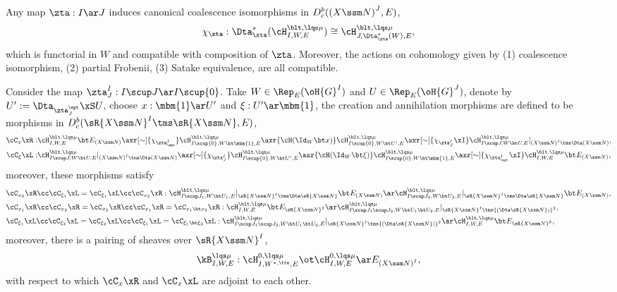 \documentclass[article, a4paper, twoside]{universal}
\begin{document}
\begin{thm}
	Any map $\zta:I\ar J$ induces canonical coalescence isomorphisms in $D_{c}^{b}({(X\ssm N)}^{J},E)$,
	\[
		\chi_{\zta}:\Dta_{\zta}^{*}(\cH_{I,W,E}^{\blt,\lqs\mu})\cong\cH_{J,\Dta_{\zta}^{*}(W),E}^{\blt,\lqs\mu},
	\]
	which is functorial in $W$ and compatible with composition of $\zta$. Moreover, the actions on cohomology given by (1) coalescence isomorphism, (2) partial Frobenii, (3) Satake equivalence, are all compatible.
\end{thm}

\begin{thm}
	Consider the map $\zta_{J}^{I}:I\scup J\ar I\scup\{0\}$. Take $W\in\Rep_{E}(\oH{G}^{I})$ and $U\in\Rep_{E}(\oH{G}^{J})$, denote by $U':=\Dta_{\zta_{J}^{\ept}}\xS U$, choose $x:\mbm{1}\ar U'$ and $\xi:U'\ar\mbm{1}$, the creation and annihilation morphisms are defined to be morphisms in $D_{c}^{b}(\sR{X\ssm N}^{I}\tms\sR{X\ssm N}, E)$,
	\begin{align*}
	  \cC_{x}\xR:& \cH_{I,W,E}^{\blt,\lqs\mu}\bt E_{(X\ssm N)}\axr[\sim]{\chi_{\zta_{\ept}^{I}}} \cH_{I\scup\{0\},W\bt\mbm{1},E}^{\blt,\lqs\mu}\axr{\cH(\Id_{W}\bt x)}\cH_{I\scup\{0\},W\bt U',E}^{\blt,\lqs\mu}\axr[\sim]{\chi_{\zta_{J}^{I}}\xI}\cH_{I\scup J,W\bt U,E}^{\blt,\lqs\mu}|_{{(X\ssm N)}^{I}\tms\Dta(X\ssm N)},\\
	  \cC_{\xi}\xL:& \cH_{I\scup J,W\bt U,E}^{\blt,\lqs\mu}|_{{(X\ssm N)}^{I}\tms\Dta(X\ssm N)}\axr[\sim]{\chi_{\zta_{J}^{I}}}\cH_{I\scup\{0\},W\bt U',E}^{\blt,\lqs\mu}\axr{\cH(\Id_{W}\bt \xi)}\cH_{I\scup\{0\},W\bt\mbm{1},E}^{\blt,\lqs\mu}\axr[\sim]{\chi_{\zta_{\ept}^{I}}\xI} \cH_{I,W,E}^{\blt,\lqs\mu}\bt E_{(X\ssm N)},
	\end{align*}
	moreover, these morphisms satisfy
	\begin{align*}
	  &\cC_{x_{2}}\xR\cc\cC_{\xi_{1}}\xL=\cC_{\xi_{1}}\xL\cc\cC_{x_{2}}\xR:\cH_{I\scup J_{1},W\bt U_{1},E}^{\blt,\lqs\mu}|_{\sR{X\ssm N}^{I}\tms\Dta\sR{X\ssm N}}\bt E_{(X\ssm N)}\ar\cH_{I\scup J_{2},W\bt U_{2},E}^{\blt,\lqs\mu}|_{\sR{X\ssm N}^{I}\tms\Dta\sR{X\ssm N}}\bt E_{(X\ssm N)}, \\
	  &\cC_{x_{1}}\xR\cc\cC_{x_{2}}\xR=\cC_{x_{2}}\xR\cc\cC_{x_{1}}\xR=\cC_{x_{1}\bt x_{2}}\xR:\cH_{I,W,E}^{\blt,\lqs\mu}\bt E_{\sR{X\ssm N}^{2}}\ar\cH_{I\scup J_{1}\scup J_{2},W\bt U_{1}\bt U_{2},E}^{\blt,\lqs\mu}|_{\sR{X\ssm N}^{I}\tms{(\Dta\sR{X\ssm N})}^{2}}, \\
	  &\cC_{\xi_{1}}\xL\cc\cC_{\xi_{2}}\xL=\cC_{\xi_{2}}\xL\cc\cC_{\xi_{1}}\xL=\cC_{\xi_{1}\bt\xi_{2}}\xL:\cH_{I\scup J_{1}\scup J_{2},W\bt U_{1}\bt U_{2},E}^{\blt,\lqs\mu}|_{\sR{X\ssm N}^{I}\tms{(\Dta\sR{X\ssm N})}^{2}}\ar\cH_{I,W,E}^{\blt,\lqs\mu}\bt E_{\sR{X\ssm N}^{2}},
	\end{align*}
	moreover, there is a pairing of sheaves over $\sR{X\ssm N}^{I}$,
	\[
		\kB_{I,W,E}^{\lqs\mu}:\cH_{I,W^{*,\tta},E}^{0,\lqs\mu}\ot\cH_{I,W,E}^{0,\lqs\mu}\ar E_{{(X\ssm N)}^{I}},
	\]
	with respect to which $\cC_{x}\xR$ and $\cC_{x}\xL$ are adjoint to each other.
\end{thm}
\end{document}
